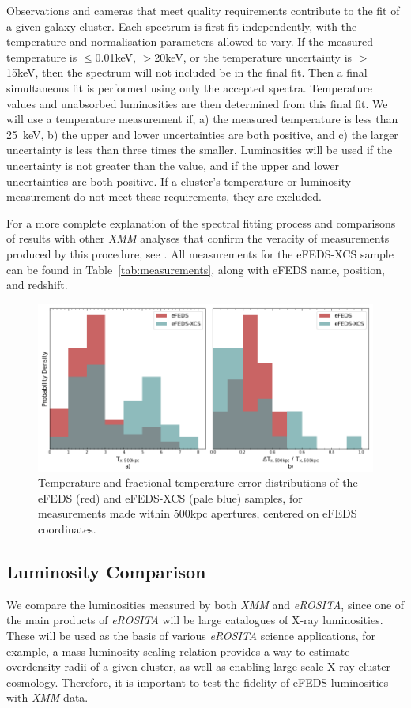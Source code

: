 \documentclass[fleqn,usenatbib]{mnras}
\begin{document}
Observations and cameras that meet quality requirements contribute to the fit of a given galaxy cluster. Each spectrum is first fit independently, with the temperature and normalisation parameters allowed to vary. If the measured temperature is $\leq$0.01keV, $>$20keV, or the temperature uncertainty is $>$ 15keV, then the spectrum will not included be in the final fit. Then a final simultaneous fit is performed using only the accepted spectra. Temperature values and unabsorbed luminosities are then determined from this final fit. We will use a temperature measurement if, a) the measured temperature is less than 25~keV, b) the upper and lower uncertainties are both positive, and c) the larger uncertainty is less than three times the smaller. Luminosities will be used if the uncertainty is not greater than the value, and if the upper and lower uncertainties are both positive. If a cluster's temperature or luminosity measurement do not meet these requirements, they are excluded.

For a more complete explanation of the spectral fitting process and comparisons of results with other {\em XMM} analyses that confirm the veracity of measurements produced by this procedure, see \cite{xcsmassmethod}. All measurements for the eFEDS-XCS sample can be found in Table~\ref{tab:measurements}, along with eFEDS name, position, and redshift.

\begin{figure}
    \centering
    \includegraphics[width=1.0\textwidth]{images/efeds_xcs_txcomp.png}
    \caption[]{Temperature and fractional temperature error distributions of the eFEDS (red) and eFEDS-XCS (pale blue) samples, for measurements made within 500kpc apertures, centered on eFEDS coordinates. } 
    \label{fig:efedsxmmtxdist}
\end{figure}

\subsection{Luminosity Comparison}
We compare the luminosities measured by both {\em XMM} and {\em eROSITA}, since one of the main products of {\em eROSITA} will be large catalogues of X-ray luminosities. These will be used as the basis of various {\em eROSITA} science applications, for example, a mass-luminosity scaling relation \citep[such as the one recently produced by ][]{efedsmor} provides a way to estimate overdensity radii of a given cluster, as well as enabling large scale X-ray cluster cosmology. Therefore, it is important to test the fidelity of eFEDS luminosities with {\em XMM} data. 
\end{document}
